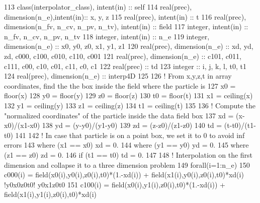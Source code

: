 \begin{DoxyCode}
113     \textcolor{keywordtype}{class}(interpolator\_class), \textcolor{keywordtype}{intent(in)} :: self
114     \textcolor{keywordtype}{real(prec)}, \textcolor{keywordtype}{dimension(n\_e)},\textcolor{keywordtype}{intent(in)}:: x, y, z
115     \textcolor{keywordtype}{real(prec)}, \textcolor{keywordtype}{intent(in)} :: t
116     \textcolor{keywordtype}{real(prec)}, \textcolor{keywordtype}{dimension(n\_fv, n\_cv, n\_pv, n\_tv)}, \textcolor{keywordtype}{intent(in)} :: field
117     \textcolor{keywordtype}{integer}, \textcolor{keywordtype}{intent(in)} :: n\_fv, n\_cv, n\_pv, n\_tv
118     \textcolor{keywordtype}{integer}, \textcolor{keywordtype}{intent(in)} :: n\_e
119     \textcolor{keywordtype}{integer}, \textcolor{keywordtype}{dimension(n\_e)} :: x0, y0, z0, x1, y1, z1
120     \textcolor{keywordtype}{real(prec)}, \textcolor{keywordtype}{dimension(n\_e)} :: xd, yd, zd, c000, c100, c010, c110, c001
121     \textcolor{keywordtype}{real(prec)}, \textcolor{keywordtype}{dimension(n\_e)} :: c101, c011, c111, c00, c10, c01, c11, c0, c1
122     \textcolor{keywordtype}{real(prec)} :: td
123     \textcolor{keywordtype}{integer} :: i, j, k, l, t0, t1
124     \textcolor{keywordtype}{real(prec)}, \textcolor{keywordtype}{dimension(n\_e)} :: interp4D
125     
126     \textcolor{comment}{! From x,y,z,t in array coordinates, find the the box inside the field where the particle is}
127     x0 = floor(x)
128     y0 = floor(y)
129     z0 = floor(z)
130     t0 = floor(t)
131     x1 = ceiling(x)
132     y1 = ceiling(y)
133     z1 = ceiling(z)
134     t1 = ceiling(t)
135 
136     \textcolor{comment}{! Compute the "normalized coordinates" of the particle inside the data field box}
137     xd = (x-x0)/(x1-x0)
138     yd = (y-y0)/(y1-y0)
139     zd = (z-z0)/(z1-z0)
140     td = (t-t0)/(t1-t0)
141 
142     \textcolor{comment}{! In case that particle is on a point box, we set it to 0 to avoid inf errors}
143     \textcolor{keywordflow}{where} (x1 == x0) xd = 0.
144     \textcolor{keywordflow}{where} (y1 == y0) yd = 0.
145     \textcolor{keywordflow}{where} (z1 == z0) zd = 0.
146     \textcolor{keywordflow}{if} (t1 == t0)    td = 0.
147     
148     \textcolor{comment}{! Interpolation on the first dimension and collapse it to a three dimension problem}
149     \textcolor{keywordflow}{forall}(i=1:n\_e)
150         c000(i) = field(x0(i),y0(i),z0(i),t0)*(1.-xd(i)) + field(x1(i),y0(i),z0(i),t0)*xd(i) \textcolor{comment}{!y0x0z0t0! 
       y0x1z0t0}
151         c100(i) = field(x0(i),y1(i),z0(i),t0)*(1.-xd(i)) + field(x1(i),y1(i),z0(i),t0)*xd(i)

\end{DoxyCode}
